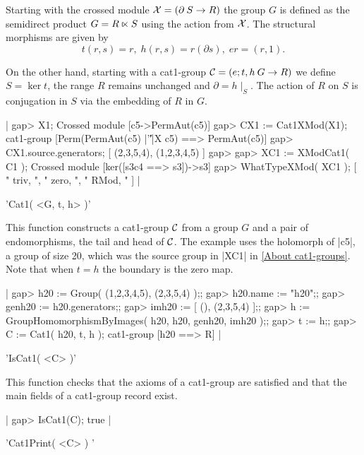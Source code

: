 Starting  with the crossed  module ${\cal X}  = (\partial \: S \to R)$
the  group   $ G $   is  defined as  the semidirect  product  $  G = R
\semidirect  S$  using the  action  from  ${\cal  X}$.  The structural
morphisms are given by $$ t(r,s)  = r, \; h(r,s) =  r (\partial s), \;
er = (r,1).  $$

On the other hand, starting with a cat1-group $ {\cal C} = (e;t,h \: G
\to R)$ we define $ S = \ker t$, the range $R$ remains unchanged and $
\partial = h\mid_S $.  The action of $R$ on  $S$ is conjugation in $S$
via the embedding of $R$ in $G$.

|    gap> X1;
    Crossed module [c5->PermAut(c5)]
    gap> CX1 := Cat1XMod(X1);
    cat1-group [Perm(PermAut(c5) |'\|'|X c5) ==> PermAut(c5)] 
    gap> CX1.source.generators;
    [ (2,3,5,4), (1,2,3,4,5) ]
    gap>
    gap> XC1 := XModCat1( C1 );
    Crossed module [ker([s3c4 ==> s3])->s3]
    gap> WhatTypeXMod( XC1 );
    [ " triv, ", " zero, ", " RMod, " ]  |


%

'Cat1( <G, t, h> )'

This function constructs a cat1-group ${\cal C}$  from a group $G$ and
a pair of endomorphisms, the tail and head of ${\cal C}$.  The example
uses the holomorph of  |c5|, a group of  size 20, which was the source
group in |XC1| in \ref{About cat1-groups}.  Note that when $t = h$ the
boundary is the zero map.

|    gap> h20 := Group( (1,2,3,4,5), (2,3,5,4) );;
    gap> h20.name := "h20";;
    gap> genh20 := h20.generators;;
    gap> imh20 := [ (), (2,3,5,4) ];;
    gap> h := GroupHomomorphismByImages( h20, h20, genh20, imh20 );;
    gap> t := h;;
    gap> C := Cat1( h20, t, h );
    cat1-group [h20 ==> R]    |
    
%

'IsCat1( <C> )'

This function checks that the axioms of a cat1-group are satisfied and
that the main fields of a cat1-group record exist.

|    gap> IsCat1(C);
    true  |

%

'Cat1Print( <C> ) '

